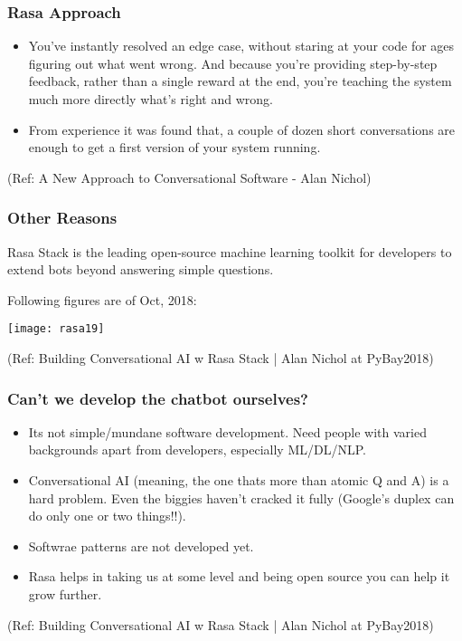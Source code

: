  \begin{frame}[fragile]\frametitle{Rasa Approach}
 

\begin{itemize}
\item You’ve instantly resolved an edge case, without staring at your code for ages figuring out what went wrong. And because you’re providing step-by-step feedback, rather than a single reward at the end, you’re teaching the system much more directly what’s right and wrong.
\item  From experience it was found that, a couple of dozen short conversations are enough to get a first version of your system running.
\end{itemize}

{\tiny (Ref: A New Approach to Conversational Software - Alan Nichol)}


\end{frame}

 \begin{frame}[fragile]\frametitle{Other Reasons}

Rasa Stack is the leading open-source machine learning toolkit for developers to extend bots beyond answering simple questions.

Following figures are of Oct, 2018:

\begin{center}
\texttt{[image: rasa19]}
\end{center}


{\tiny (Ref: Building Conversational AI w Rasa Stack | Alan Nichol at PyBay2018)}

\end{frame}


 \begin{frame}[fragile]\frametitle{Can't we develop the chatbot ourselves?}

\begin{itemize}
\item Its not simple/mundane software development. Need people with varied backgrounds apart from developers, especially ML/DL/NLP.
\item Conversational AI (meaning, the one thats more than atomic Q and A) is a hard problem. Even the biggies haven't cracked it fully (Google's duplex can do only one or two things!!).
\item Softwrae patterns are not developed yet.
\item Rasa helps in taking us at some level and being open source you can help it grow further.
\end{itemize}


{\tiny (Ref: Building Conversational AI w Rasa Stack | Alan Nichol at PyBay2018)}

\end{frame}

